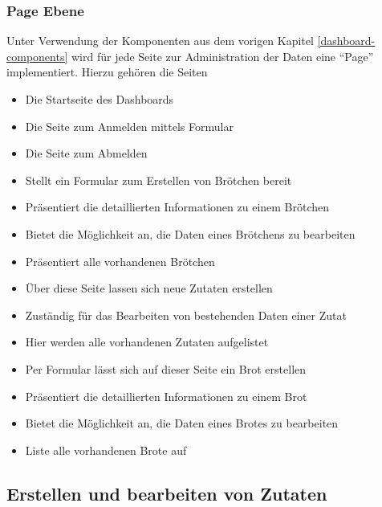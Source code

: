 \subsubsection{Page Ebene}
Unter Verwendung der Komponenten aus dem vorigen Kapitel \ref{dashboard-components} wird für jede Seite zur Administration der Daten eine \enquote{Page} implementiert. Hierzu gehören die Seiten
\begin{itemize}
	\item {} Die Startseite des Dashboards
	\item {} Die Seite zum Anmelden mittels Formular
	\item {} Die Seite zum Abmelden
	\item {} Stellt ein Formular zum Erstellen von Brötchen bereit
	\item {} Präsentiert die detaillierten Informationen zu einem Brötchen
	\item {} Bietet die Möglichkeit an, die Daten eines Brötchens zu bearbeiten
	\item {} Präsentiert alle vorhandenen Brötchen
	\item {} Über diese Seite lassen sich neue Zutaten erstellen
	\item {} Zuständig für das Bearbeiten von bestehenden Daten einer Zutat
	\item {} Hier werden alle vorhandenen Zutaten aufgelistet
	\item {} Per Formular lässt sich auf dieser Seite ein Brot erstellen
	\item {} Präsentiert die detaillierten Informationen zu einem Brot
	\item {} Bietet die Möglichkeit an, die Daten eines Brotes zu bearbeiten
	\item {} Liste alle vorhandenen Brote auf
\end{itemize}

\clearpage

\subsection{Erstellen und bearbeiten von Zutaten}


